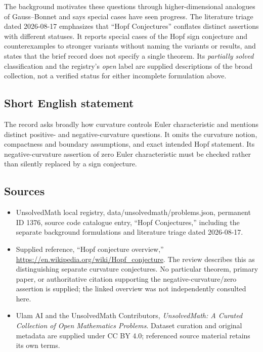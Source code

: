 \documentclass[11pt]{article}
\begin{document}
The background motivates these questions through higher-dimensional analogues of Gauss--Bonnet and says special cases have seen progress. The literature triage dated 2026-08-17 emphasizes that ``Hopf Conjectures'' conflates distinct assertions with different statuses. It reports special cases of the Hopf sign conjecture and counterexamples to stronger variants without naming the variants or results, and states that the brief record does not specify a single theorem. Its \emph{partially solved} classification and the registry's \emph{open} label are supplied descriptions of the broad collection, not a verified status for either incomplete formulation above.
\subsection{Short English statement}
The record asks broadly how curvature controls Euler characteristic and mentions distinct positive- and negative-curvature questions. It omits the curvature notion, compactness and boundary assumptions, and exact intended Hopf statement. Its negative-curvature assertion of zero Euler characteristic must be checked rather than silently replaced by a sign conjecture.
\subsection{Sources}
\begin{itemize}
\item UnsolvedMath local registry, data/unsolvedmath/problems.json, permanent ID 1376, source code catalogue entry, ``Hopf Conjectures,'' including the separate background formulations and literature triage dated 2026-08-17.
\item Supplied reference, ``Hopf conjecture overview,'' \url{https://en.wikipedia.org/wiki/Hopf_conjecture}. The review describes this as distinguishing separate curvature conjectures. No particular theorem, primary paper, or authoritative citation supporting the negative-curvature/zero assertion is supplied; the linked overview was not independently consulted here.
\item Ulam AI and the UnsolvedMath Contributors, \emph{UnsolvedMath: A Curated Collection of Open Mathematics Problems}. Dataset curation and original metadata are supplied under CC BY 4.0; referenced source material retains its own terms.
\end{itemize}
\end{document}
